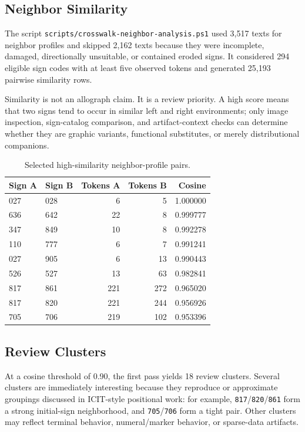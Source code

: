 \subsection{Neighbor Similarity}

The script \texttt{scripts/crosswalk-neighbor-analysis.ps1} used 3,517 texts for neighbor profiles and skipped 2,162 texts because they were incomplete, damaged, directionally unsuitable, or contained eroded signs. It considered 294 eligible sign codes with at least five observed tokens and generated 25,193 pairwise similarity rows.

Similarity is not an allograph claim. It is a review priority. A high score means that two signs tend to occur in similar left and right environments; only image inspection, sign-catalog comparison, and artifact-context checks can determine whether they are graphic variants, functional substitutes, or merely distributional companions.

\begin{table}[htbp]
\centering
\begin{tabular}{llrrr}
\toprule
\textbf{Sign A} & \textbf{Sign B} & \textbf{Tokens A} & \textbf{Tokens B} & \textbf{Cosine} \\
\midrule
027 & 028 & 6 & 5 & 1.000000 \\
636 & 642 & 22 & 8 & 0.999777 \\
347 & 849 & 10 & 8 & 0.992278 \\
110 & 777 & 6 & 7 & 0.991241 \\
027 & 905 & 6 & 13 & 0.990443 \\
526 & 527 & 13 & 63 & 0.982841 \\
817 & 861 & 221 & 272 & 0.965020 \\
817 & 820 & 221 & 244 & 0.956926 \\
705 & 706 & 219 & 102 & 0.953396 \\
\bottomrule
\end{tabular}
\caption{Selected high-similarity neighbor-profile pairs.}
\label{tab:neighbor-pairs}
\end{table}

\subsection{Review Clusters}

At a cosine threshold of 0.90, the first pass yields 18 review clusters. Several clusters are immediately interesting because they reproduce or approximate groupings discussed in ICIT-style positional work: for example, \texttt{817}/\texttt{820}/\texttt{861} form a strong initial-sign neighborhood, and \texttt{705}/\texttt{706} form a tight pair. Other clusters may reflect terminal behavior, numeral/marker behavior, or sparse-data artifacts.

